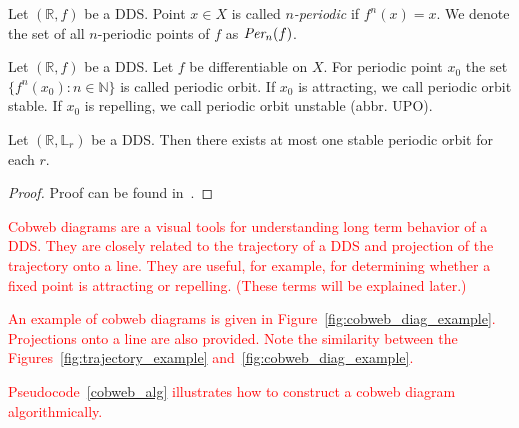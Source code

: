 \begin{definition}
    Let $\left( \mathbb{R}, f\right)$ be a DDS. Point $x \in X$ is called \emph{$n$-periodic} if $f^{n}(x)=x$.
    We denote the set of all $n$-periodic points of $f$ as $\emph{Per}_{n}(f)$.~\cite{Devaney20211026}
\end{definition}

\begin{definition}
    Let $\left(\mathbb{R}, f\right)$ be a DDS. Let $f$ be differentiable on $X$. For periodic point $x_0$ the set $\{f^{n}(x_0):n \in \mathbb{N}\}$ is called periodic orbit.
    If $x_0$ is attracting, we call periodic orbit stable.
    If $x_0$ is repelling, we call periodic orbit unstable (abbr. UPO).
\end{definition}

\begin{theorem}
    Let $\left(\mathbb{R}, \mathbb{L}_r\right)$ be a DDS. Then there exists at most one stable periodic orbit for each $r$.~\cite[p.~74]{Devaney20211026}
\end{theorem}

\begin{proof}
    Proof can be found in~\cite[p.~74]{Devaney20211026}.
\end{proof}

\label{def:cobweb}
\begin{remark}
    \textcolor{red}{
    Cobweb diagrams are a visual tools for understanding long term behavior of a DDS.
    They are closely related to the trajectory of a DDS and projection of the trajectory onto a line.
    They are useful, for example, for determining whether a fixed point is attracting or repelling. (These terms will be explained later.)
    }
    \par
    \textcolor{red}{
    An example of cobweb diagrams is given in Figure~\ref{fig:cobweb_diag_example}.
    Projections onto a line are also provided.
    Note the similarity between the Figures~\ref{fig:trajectory_example} and~\ref{fig:cobweb_diag_example}.
    }
    \par
    \textcolor{red}{
    Pseudocode~\ref{cobweb_alg} illustrates how to construct a cobweb diagram algorithmically.
    }
\end{remark}

